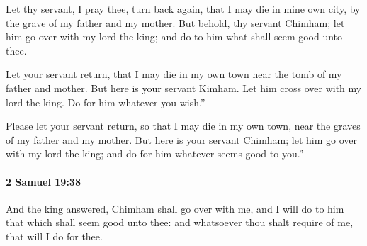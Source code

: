 			\begin{versebox}
					\item[BHS] 
					\item[ASV] Let thy servant, I pray thee, turn back again, that I may die in mine own city, by the grave of my father and my mother. But behold, thy servant Chimham; let him go over with my lord the king; and do to him what shall seem good unto thee.
					\item[NIV] Let your servant return, that I may die in my own town near the tomb of my father and mother. But here is your servant Kimham. Let him cross over with my lord the king. Do for him whatever you wish.”
					\item[NRSV] Please let your servant return, so that I may die in my own town, near the graves of my father and my mother. But here is your servant Chimham; let him go over with my lord the king; and do for him whatever seems good to you.”
			\end{versebox}

		\paragraph{2 Samuel 19:38} %
			\label{2SAMUEL-19-38}

			And the king answered, Chimham shall go over with me, and I will do to him that which shall seem good unto thee: and whatsoever thou shalt require of me, that will I do for thee.

